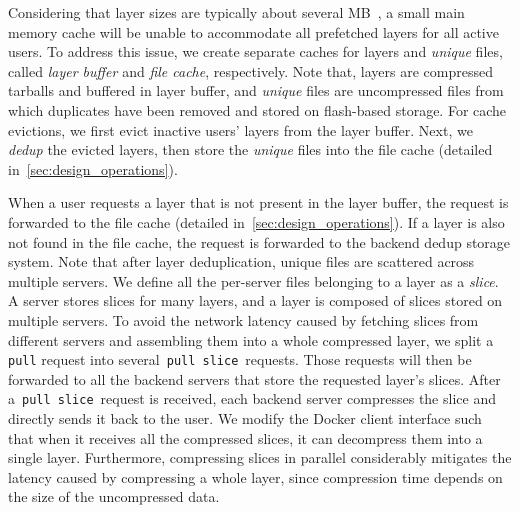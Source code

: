 

Considering that layer sizes are typically about several MB~\cite{dockerworkload}, 
a small main memory cache will be unable to accommodate
all prefetched layers for all active users. 
To address this issue, we 
create separate caches for layers and \emph{unique} files, called {\em layer buffer} and {\em file cache}, respectively. 
Note that, layers are  compressed tarballs and buffered in layer buffer, and 
 \emph{unique} files are uncompressed files from which duplicates have been removed and stored on flash-based storage. 
For 
cache evictions, we first evict inactive users' layers from the layer buffer.
Next, we \emph{dedup} the evicted layers, then store the \emph{unique} files
into the file cache (detailed in~\cref{sec:design_operations}). 

When a user requests a
layer that is not present in the layer buffer, the request is forwarded to the
file cache (detailed in~\cref{sec:design_operations}). 
If a layer is also not found in the
file cache, the request is forwarded to the backend dedup storage system.
Note that after layer deduplication, unique files are
scattered across multiple servers. 
We define all the per-server files belonging to a layer as a {\em slice}. 
A server stores slices for many layers, and a layer is composed of slices stored on multiple servers.
To avoid the network latency caused by fetching slices from different servers and
assembling them into a whole compressed layer, we split a \texttt{pull} request 
into several~\texttt{pull slice}~requests. Those requests will then be
forwarded to all the backend servers that store the requested
layer's slices. 
After a~\texttt{pull slice}~request is received, each backend server compresses the slice 
and directly sends it back to the user.
We modify the Docker client
interface such that when it receives all the compressed slices, it can
decompress them into a single layer. 
Furthermore, compressing slices in parallel considerably mitigates the latency caused by
compressing a whole layer, since compression time depends on the size of the
uncompressed data.



 
